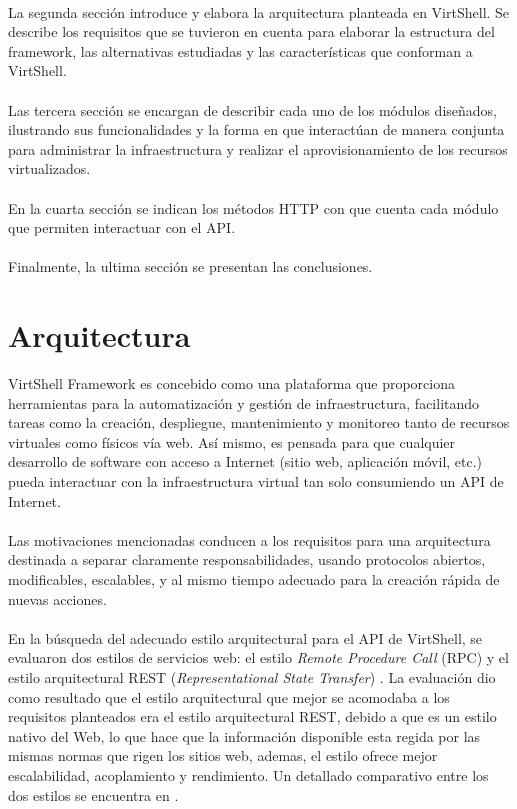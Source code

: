 \documentclass[conference, spanish]{IEEEtran}
\begin{document}
\\
La segunda sección introduce y elabora la arquitectura planteada en VirtShell. Se describe los requisitos que se tuvieron en cuenta para elaborar la estructura del framework, las alternativas estudiadas y las características que conforman a VirtShell.\\
\\
Las tercera sección se encargan de describir cada uno de los módulos diseñados, ilustrando sus funcionalidades y la forma en que interactúan de manera conjunta para administrar la infraestructura y realizar el aprovisionamiento de los recursos virtualizados.\\
\\
En la cuarta sección se indican los métodos HTTP con que cuenta cada módulo que permiten interactuar con el API.\\
\\
Finalmente, la ultima sección se presentan las conclusiones.


\section{Arquitectura}
VirtShell Framework es concebido como una plataforma que proporciona herramientas para la automatización y gestión de infraestructura, facilitando tareas como la creación, despliegue, mantenimiento y monitoreo tanto de recursos virtuales como físicos vía web. Así mismo, es pensada para que cualquier desarrollo de software con acceso a Internet (sitio web, aplicación móvil, etc.) pueda interactuar con la infraestructura virtual tan solo consumiendo un API de Internet.\\
\\
Las motivaciones mencionadas conducen a los requisitos para una arquitectura destinada a separar claramente responsabilidades, usando protocolos abiertos, modificables, escalables, y al mismo tiempo adecuado para la creación rápida de nuevas acciones. \\
\\
En la búsqueda del adecuado estilo arquitectural para el API de VirtShell, se evaluaron dos estilos de servicios web: el estilo \emph{Remote Procedure Call} (RPC) y el estilo arquitectural REST (\emph{Representational State Transfer}) \cite{fielding00}. La evaluación dio como resultado que el estilo arquitectural que mejor se acomodaba a los requisitos planteados era el estilo arquitectural REST, debido a que es un estilo nativo del Web, lo que hace que la información disponible esta regida por las mismas normas que rigen los sitios web, ademas, el estilo ofrece mejor escalabilidad, acoplamiento y rendimiento. Un detallado comparativo entre los dos estilos se encuentra en \cite{Xinyang09}. 
\end{document}

